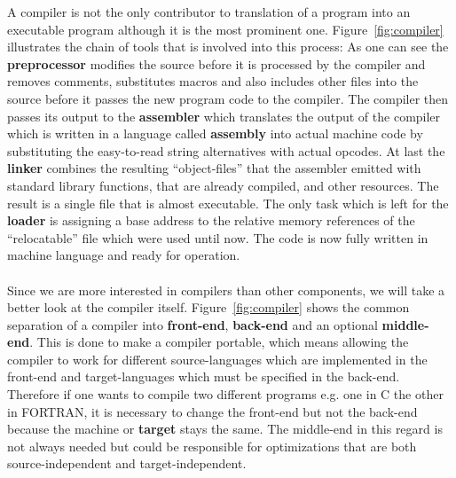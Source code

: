 A compiler is not the only contributor to translation of a program into an executable program although it is the most prominent one.
Figure~\ref{fig:compiler} illustrates the chain of tools that is involved into this process:
As one can see the \textbf{preprocessor} modifies the source before it is processed by the compiler and removes comments, substitutes macros and also includes other files into the source before it passes the new program code to the compiler.
The compiler then passes its output to the \textbf{assembler} which translates the output of the compiler which is written in a language called \textbf{assembly} into actual machine code by substituting the easy-to-read string alternatives with actual opcodes.
At last the \textbf{linker} combines the resulting ``object-files'' that the assembler emitted with standard library functions, that are already compiled, and other resources. 
The result is a single file that is almost executable.
The only task which is left for the \textbf{loader} is assigning a base address to the relative memory references of the ``relocatable'' file which were used until now.
The code is now fully written in machine language and ready for operation.
\\
\\
Since we are more interested in compilers than other components, we will take a better look at the compiler itself.
Figure~\ref{fig:compiler} shows the common separation of a compiler into \textbf{front-end}, \textbf{back-end} and an optional \textbf{middle-end}.
This is done to make a compiler portable, which means allowing the compiler to work for different source-languages which are implemented in the front-end and target-languages which must be specified in the back-end.
Therefore if one wants to compile two different programs e.g. one in C the other in FORTRAN, it is necessary to change the front-end but not the back-end because the machine or \textbf{target} stays the same.
The middle-end in this regard is not always needed but could be responsible for optimizations that are both source-independent and target-independent.

